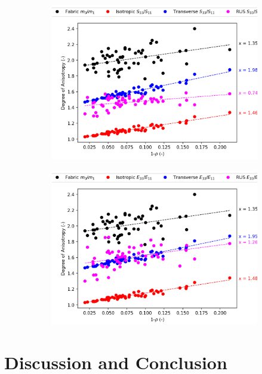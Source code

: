 \documentclass[a4paper,fleqn]{DC_ArtStyle}
\begin{document}
	\begin{figure}[!h]
		\begin{subfigure}[b]{0.45\linewidth}
			\includegraphics[width=\linewidth]{AnisotropyBVTV_S}
		\end{subfigure}
		\begin{subfigure}[b]{0.45\linewidth}
			\includegraphics[width=\linewidth]{AnisotropyBVTV_E}
		\end{subfigure}
	\end{figure}

	
	\clearpage
	\section{Discussion and Conclusion}
	
\end{document}
